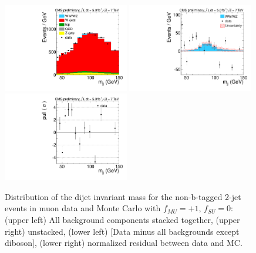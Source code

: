 \begin{figure}[h!]
  {\centering
    \includegraphics[width=0.49\textwidth]{figs/ScaleAndMatchingCrossChecks/mu2JNoBTag_fSU0fMUp1/Wjj_Diboson_Muon_2jets_Stacked.pdf}
    \includegraphics[width=0.49\textwidth]{figs/ScaleAndMatchingCrossChecks/mu2JNoBTag_fSU0fMUp1/Wjj_Diboson_Muon_2jets_Subtracted.pdf}
    \includegraphics[width=0.49\textwidth]{figs/ScaleAndMatchingCrossChecks/mu2JNoBTag_fSU0fMUp1/Wjj_Diboson_Muon_2jets_Pull.pdf}
    \caption{Distribution of the dijet invariant mass for the non-b-tagged 2-jet events in muon data and Monte Carlo with $f_{MU}=+1$, $f_{SU}=0$: 
      (upper left) All background components stacked together, 
      (upper right) unstacked, (lower left) [Data minus all backgrounds except diboson],  
      (lower right) normalized residual between data and MC. }
    \label{fig:fsufmuXcheck_fSU0fMUp1}}
\end{figure}
